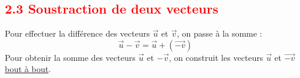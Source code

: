 \documentclass[12pt]{article}
\begin{document}
\vspace{20pt}


\subsection*{\textcolor{red}{2.3 Soustraction de deux vecteurs}}

\vspace{5pt}
Pour effectuer la différence des vecteurs $\overrightarrow{u}$ et $\overrightarrow{v}$, on passe à la somme :
\[
    \overrightarrow{u} - \overrightarrow{v} = \overrightarrow{u} + (\overrightarrow{-v})
\]
Pour obtenir la somme des vecteurs $\overrightarrow{u}$ et $-\overrightarrow{v}$, on construit les vecteurs 
$\overrightarrow{u}$ et $\overrightarrow{-v}$ \underline{bout à bout}.

\vspace{10pt}
\end{document}
